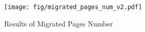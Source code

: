 \begin{figure}[t]
  \centering
  \texttt{[image: fig/migrated\_pages\_num\_v2.pdf]}
  \caption{Results of Migrated Pages Number}
  \label{fig:migrated_pages_num}
\end{figure}
